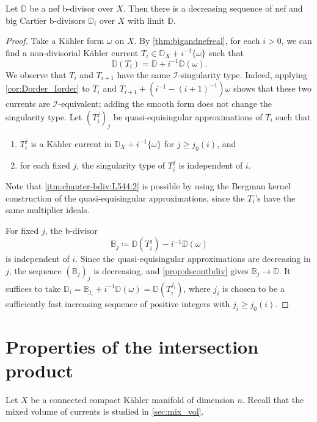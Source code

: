 \begin{corollary}\label{cor:nef_Cartierseq}
    Let $\mathbb{D}$ be a nef b-divisor over $X$. Then there is a decreasing sequence of nef and big Cartier b-divisors $\mathbb{D}_i$ over $X$ with limit $\mathbb{D}$.
\end{corollary}
\begin{proof}
    Take a Kähler form $\omega$ on $X$. By \cref{thm:bigandnefreal}, for each $i>0$, we can find a non-divisorial Kähler current $T_i\in \mathbb{D}_X+i^{-1}\{\omega\}$ such that
    \[
    \mathbb{D}(T_i)=\mathbb{D}+i^{-1}\mathbb{D}(\omega).
    \]
    We observe that $T_i$ and $T_{i+1}$ have the same $\mathcal{I}$-singularity type. Indeed, applying \cref{cor:Dorder_Iorder} to $T_i$ and $T_{i+1}+(i^{-1}-(i+1)^{-1})\omega$ shows that these two currents are $\mathcal{I}$-equivalent; adding the smooth form does not change the singularity type.
    Let $(T_i^j)_j$ be quasi-equisingular approximations of $T_i$ such that
    \begin{enumerate}
        \item\label{itm:chapter-bdiv:L544:1}
        $T_i^j$ is a Kähler current in $\mathbb{D}_X+i^{-1}\{\omega\}$ for $j\geq j_0(i)$, and
        \item\label{itm:chapter-bdiv:L544:2} for each fixed $j$, the singularity type of $T_i^j$ is independent of $i$.
    \end{enumerate}
    Note that \ref{itm:chapter-bdiv:L544:2} is possible by using the Bergman kernel construction of the quasi-equisingular approximations, since the $T_i$'s have the same multiplier ideals.

    For fixed $j$, the b-divisor
    \[
        \mathbb{B}_j\coloneqq \mathbb{D}(T_i^j)-i^{-1}\mathbb{D}(\omega)
    \]
    is independent of $i$. Since the quasi-equisingular approximations are decreasing in $j$, the sequence $(\mathbb{B}_j)_j$ is decreasing, and \cref{prop:dscontbdiv} gives $\mathbb{B}_j\to \mathbb{D}$. It suffices to take $\mathbb{D}_i=\mathbb{B}_{j_i}+i^{-1}\mathbb{D}(\omega)=\mathbb{D}(T_i^{j_i})$, where $j_i$ is chosen to be a sufficiently fast increasing sequence of positive integers with $j_i\geq j_0(i)$.
\end{proof}


\section{Properties of the intersection product}\label{sec:int_b_div}
Let $X$ be a connected compact Kähler manifold of dimension $n$. Recall that the mixed volume of currents is studied in \cref{sec:mix_vol}.

